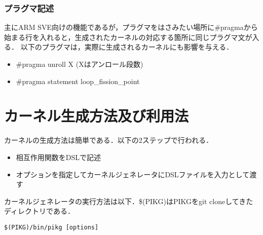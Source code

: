 \documentclass{article}
\begin{document}
\subsubsection{プラグマ記述}
主にARM SVE向けの機能であるが，プラグマをはさみたい場所に\#pragmaから始まる行を入れると，生成されたカーネルの対応する箇所に同じプラグマ文が入る．
以下のプラグマは，実際に生成されるカーネルにも影響を与える．
 \begin{itemize}
  \item \#pragma unroll X (Xはアンロール段数)
  \item \#pragma statement loop\_fission\_point
 \end{itemize}


\section{カーネル生成方法及び利用法}
カーネルの生成方法は簡単である．以下の2ステップで行われる．
 \begin{itemize}
  \item 相互作用関数をDSLで記述
  \item オプションを指定してカーネルジェネレータにDSLファイルを入力として渡す
 \end{itemize}
 カーネルジェネレータの実行方法は以下．\$(PIKG)はPIKGをgit cloneしてきたディレクトリである．
\begin{verbatim}
$(PIKG)/bin/pikg [options]
\end{verbatim}
\end{document}
